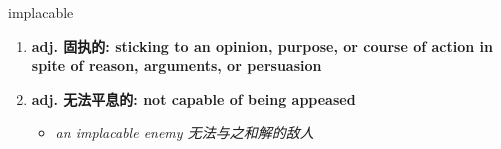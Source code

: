 
\begin{frame}
{\huge implacable}
\begin{center}
\begin{enumerate}\Large
  \item \textbf{adj. 固执的: sticking to an opinion, purpose, or course of action in spite of reason, arguments, or persuasion}
  \item \textbf{adj. 无法平息的: not capable of being appeased}
  \begin{itemize}
    \item \em{\Large{an implacable enemy 无法与之和解的敌人}}
  \end{itemize}
\end{enumerate}
\end{center}
\end{frame}
